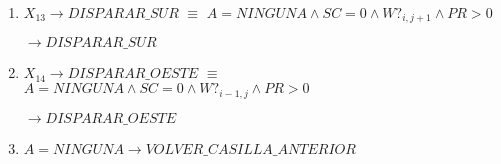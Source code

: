 \begin{enumerate}
    \item $X_{13} \longrightarrow DISPARAR\_SUR$
    $\equiv$
    \newline
    $A = NINGUNA \land SC = 0 \land W?_{i, j+1} \land PR > 0$ 
            
    $\longrightarrow DISPARAR\_SUR$
            
    \item $X_{14} \longrightarrow DISPARAR\_OESTE$
    $\equiv$
    \newline
    $A = NINGUNA \land SC = 0 \land W?_{i-1, j} \land PR > 0$ 
            
    $\longrightarrow DISPARAR\_OESTE$

    \item $A = NINGUNA \longrightarrow VOLVER\_CASILLA\_ANTERIOR$
\end{enumerate}{}